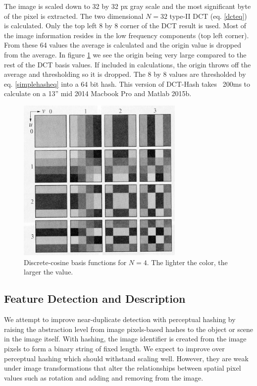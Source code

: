 \documentclass[english,12pt,a4paper,pdftex,elec,utf8, table]{aaltothesis}
\begin{document}
The image is scaled down to 32 by 32 px gray scale and the most significant byte of the pixel is extracted. The two dimensional $N=32$ type-II DCT (eq. \ref{dcteq}) is calculated. Only the top left 8 by 8 corner of the DCT result is used. Most of the image information resides in the low frequency components (top left corner). From these 64 values the average is calculated and the origin value is dropped from the average. In figure \ref{dctkernels} we see the origin being very large compared to the rest of the DCT basis values. If included in calculations, the origin throws off the average and thresholding so it is dropped. The 8 by 8 values are thresholded by eq. \ref{simplehasheq} into a 64 bit hash. This version of DCT-Hash takes ~200ms to calculate on a 13'' mid 2014 Macbook Pro and Matlab 2015b.

\begin{figure}[htb]
\begin{center}
\includegraphics[height=8cm]{figures/dct}
\end{center}
\caption{Discrete-cosine basis functions for $N = 4$. The lighter the color, the larger the value. \cite[p. 473]{Gonzalez2002}}
\label{dctkernels}
\end{figure}

\subsection{Feature Detection and Description}
We attempt to improve near-duplicate detection with perceptual hashing by raising the abstraction level from image pixels-based hashes to the object or scene in the image itself. With hashing, the image identifier is created from the image pixels to form a binary string of fixed length. We expect to improve over perceptual hashing which should withstand scaling well. However, they are weak under image transformations that alter the relationships between spatial pixel values such as rotation and adding and removing from the image.
\end{document}
